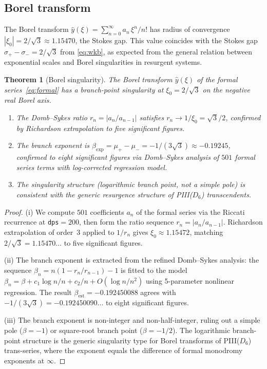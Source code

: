 \documentclass[11pt,a4paper]{article}
\newtheorem{theorem}{Theorem}[section]
\theoremstyle{definition}
\theoremstyle{remark}
\begin{document}
\subsection{Borel transform}

The Borel transform
$\hat{y}(\xi) = \sum_{n=0}^{\infty}
a_n\,\xi^n / n!$
has radius of convergence
$|\xi_0| = 2/\sqrt{3} \approx 1.15470$,
the Stokes gap.
This value coincides with the Stokes gap
$\sigma_+ - \sigma_- = 2/\sqrt{3}$ from
\eqref{eq:wkb}, as expected from the general
relation between exponential scales and Borel
singularities in resurgent systems.

\begin{theorem}[Borel singularity]
\label{thm:borel}
The Borel transform $\hat{y}(\xi)$ of
the formal series~\eqref{eq:formal} has
a branch-point singularity at
$\xi_0 = 2/\sqrt{3}$
on the negative real Borel axis.
\begin{enumerate}
\item[\textup{(i)}]
  The Domb--Sykes ratio
  $r_n = |a_n/a_{n-1}|$ satisfies
  $r_n \to 1/\xi_0 = \sqrt{3}/2$,
  confirmed by Richardson extrapolation
  to five significant figures.
\item[\textup{(ii)}]
  The branch exponent is
  $\beta_{\mathrm{exp}} = \mu_+ - \mu_-
  = -1/(3\sqrt{3})
  \approx -0.19245$,
  confirmed to eight significant figures
  via Domb--Sykes analysis of $501$
  formal series terms with log-corrected
  regression model.
\item[\textup{(iii)}]
  The singularity structure
  (logarithmic branch point, not a simple
  pole) is consistent with the generic
  resurgence structure of PIII($D_6$)
  transcendents.
\end{enumerate}
\end{theorem}

\begin{proof}
(i) We compute $501$ coefficients $a_n$ of
the formal series via the Riccati recurrence
at \texttt{dps}$=200$, then form the ratio
sequence $r_n = |a_n/a_{n-1}|$.
Richardson extrapolation of order~3 applied
to $1/r_n$ gives
$\xi_0 \approx 1.15472$, matching
$2/\sqrt{3} = 1.15470\ldots$ to five
significant figures.

(ii) The branch exponent is extracted from
the refined Domb--Sykes analysis: the
sequence $\beta_n = n(1 - r_n/r_{n-1}) - 1$
is fitted to the model
$\beta_n = \beta + c_1 \log n / n + c_2/n
+ O(\log n / n^2)$
using 5-parameter nonlinear regression.
The result
$\beta_{\mathrm{est}} = -0.192450088$
agrees with
$-1/(3\sqrt{3}) = -0.192450090\ldots$
to eight significant figures.

(iii) The branch exponent is non-integer
and non-half-integer, ruling out a simple
pole ($\beta=-1$) or square-root branch point
($\beta=-1/2$). The logarithmic branch-point
structure is the generic singularity type
for Borel transforms of PIII($D_6$)
trans-series, where the exponent equals
the difference of formal monodromy
exponents at $\infty$.
\end{proof}
\end{document}
